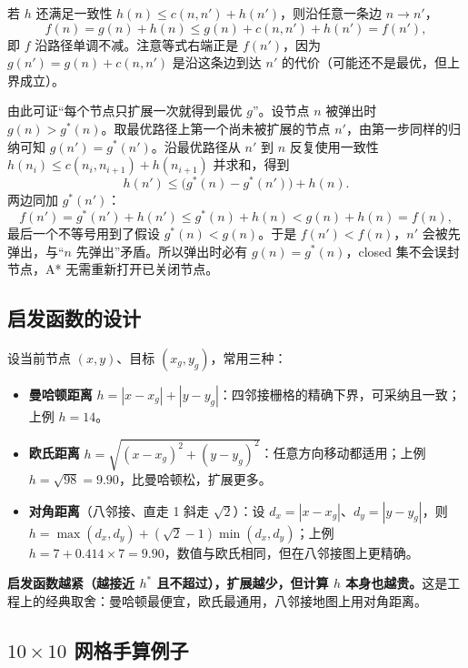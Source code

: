 若 $h$ 还满足一致性 $h(n)\le c(n,n')+h(n')$，则沿任意一条边 $n\to n'$，
\begin{equation}
  f(n)=g(n)+h(n)\le g(n)+c(n,n')+h(n')=f(n'),
\end{equation}
即 $f$ 沿路径单调不减。注意等式右端正是 $f(n')$，因为 $g(n')=g(n)+c(n,n')$ 是沿这条边到达 $n'$ 的代价（可能还不是最优，但上界成立）。

由此可证“每个节点只扩展一次就得到最优 $g$”。设节点 $n$ 被弹出时 $g(n)>g^*(n)$。取最优路径上第一个尚未被扩展的节点 $n'$，由第一步同样的归纳可知 $g(n')=g^*(n')$。沿最优路径从 $n'$ 到 $n$ 反复使用一致性 $h(n_i)\le c(n_i,n_{i+1})+h(n_{i+1})$ 并求和，得到
\begin{equation}
  h(n')\le \bigl(g^*(n)-g^*(n')\bigr)+h(n).
\end{equation}
两边同加 $g^*(n')$：
\begin{equation}
  f(n')=g^*(n')+h(n')\le g^*(n)+h(n)<g(n)+h(n)=f(n),
\end{equation}
最后一个不等号用到了假设 $g^*(n)<g(n)$。于是 $f(n')<f(n)$，$n'$ 会被先弹出，与“$n$ 先弹出”矛盾。所以弹出时必有 $g(n)=g^*(n)$，closed 集不会误封节点，A* 无需重新打开已关闭节点。

\subsection{启发函数的设计}

设当前节点 $(x,y)$、目标 $(x_g,y_g)$，常用三种：

\begin{itemize}
  \item \textbf{曼哈顿距离} $h=|x-x_g|+|y-y_g|$：四邻接栅格的精确下界，可采纳且一致；上例 $h=14$。
  \item \textbf{欧氏距离} $h=\sqrt{(x-x_g)^2+(y-y_g)^2}$：任意方向移动都适用；上例 $h=\sqrt{98}=9.90$，比曼哈顿松，扩展更多。
  \item \textbf{对角距离}（八邻接、直走 1 斜走 $\sqrt2$）：设 $d_x=|x-x_g|$、$d_y=|y-y_g|$，则 $h=\max(d_x,d_y)+(\sqrt2-1)\min(d_x,d_y)$；上例 $h=7+0.414\times7=9.90$，数值与欧氏相同，但在八邻接图上更精确。
\end{itemize}

\textbf{启发函数越紧（越接近 $h^*$ 且不超过），扩展越少，但计算 $h$ 本身也越贵。}这是工程上的经典取舍：曼哈顿最便宜，欧氏最通用，八邻接地图上用对角距离。

\subsection{$10\times10$ 网格手算例子}

